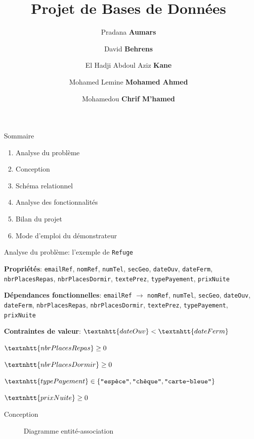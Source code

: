 \documentclass{beamer}
\title{Projet de Bases de Données}
\author{Pradana \textbf{Aumars}
  \and
  David \textbf{Behrens}
  \and
  El Hadji Abdoul Aziz \textbf{Kane}
  \and
  Mohamed Lemine \textbf{Mohamed Ahmed}
  \and
  Mohamedou \textbf{Chrif M'hamed}}
\newcommand\att[1]{\textnhtt{#1}}
\begin{document}
\frame{\titlepage}
\begin{frame}{Sommaire}
  \begin{enumerate}
  \item Analyse du problème
  \item Conception
  \item Schéma relationnel
  \item Analyse des fonctionnalités
  \item Bilan du projet
  \item Mode d'emploi du démonstrateur
  \end{enumerate}
\end{frame}
\begin{frame}{Analyse du problème: l'exemple de \att{Refuge}}
  
  \textbf{Propriétés}: 
\att{emailRef}, %
\att{nomRef}, %
\att{numTel}, %
\att{secGeo}, %
\att{dateOuv}, %
\att{dateFerm}, %
\att{nbrPlacesRepas}, %
\att{nbrPlacesDormir}, %
\att{textePrez}, %
\att{typePayement}, %
\att{prixNuite} %

\textbf{Dépendances fonctionnelles}:
\att{emailRef}
$\rightarrow$
\att{nomRef},
\att{numTel},
\att{secGeo},
\att{dateOuv},
\att{dateFerm},
\att{nbrPlacesRepas},
\att{nbrPlacesDormir},
\att{textePrez},
\att{typePayement},
\att{prixNuite}

\textbf{Contraintes de valeur}:
$\att{dateOuv} < \att{dateFerm}$

$\att{nbrPlacesRepas} \geq 0$

$\att{nbrPlacesDormir} \geq 0$

$\att{typePayement} \in \{ \texttt{"espèce"}, \texttt{"chèque"}, \texttt{"carte-bleue"} \}$

$\att{prixNuite} \geq 0$
\end{frame}

\begin{frame}{Conception}
  \begin{figure}[H]

\caption{Diagramme entité-association}
\end{figure}
\end{frame}
\end{document}
